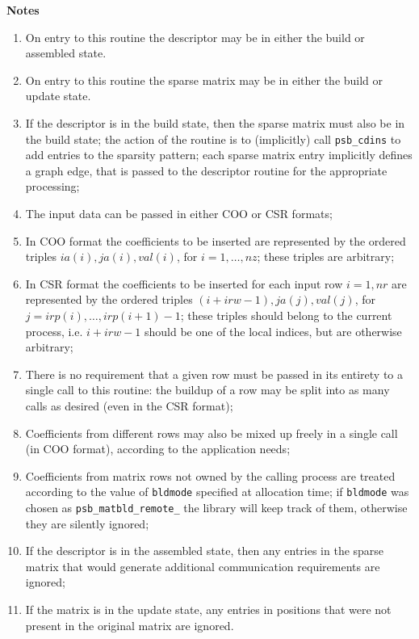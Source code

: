 {\par\noindent\large\bfseries Notes}
\begin{enumerate}
\item On entry to this routine the descriptor may be in either the
  build or assembled state.
\item On entry to this routine the sparse matrix may be in either the
  build or update state. 
\item If the descriptor is in the build state, then the sparse matrix
  must also be in the build state; the action of the routine is to
  (implicitly) call \verb|psb_cdins| to add entries to the sparsity
  pattern; each sparse matrix entry implicitly defines a graph edge,
  that is passed to the descriptor routine for the appropriate
  processing;
\item The input data can be passed in either COO or CSR formats;
\item In COO format the coefficients to be inserted are represented by
  the ordered   triples $ia(i),ja(i),val(i)$, for $i=1,\dots,nz$;
  these triples are arbitrary;
\item In CSR format the coefficients to be inserted for each input row $i=1,nr$
  are represented by the ordered triples $(i+irw-1),ja(j),val(j)$, for
  $j=irp(i),\dots,irp(i+1)-1$; 
  these triples  should belong to the current process, i.e. $i+irw-1$
  should be one of  the local indices, but are otherwise arbitrary;  
\item There is no   requirement that a given row must be passed in its
  entirety to a   single call to this routine: the buildup of a row
  may be split into   as many calls as desired (even in the CSR format); 
\item Coefficients from different rows may also be mixed up freely
  in a single call (in COO format), according to the application needs; 
\item Coefficients from matrix rows not owned by the calling
  process are treated according to the value of \verb|bldmode|
  specified at allocation time; if 
  \verb|bldmode| was chosen as \verb|psb_matbld_remote_| the library
  will keep track of them, otherwise they are   silently ignored;
\item If the descriptor is in the assembled state, then any entries in
  the sparse matrix that would generate additional communication
  requirements are  ignored; 
\item If the matrix is in the update state, any entries in positions
  that were not present in the original matrix are ignored. 
\end{enumerate}

